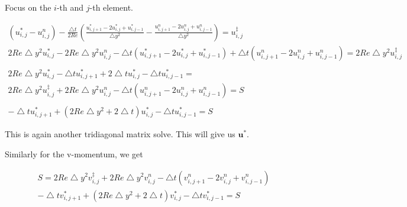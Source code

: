 \documentclass[12pt]{article}
\begin{document}
Focus on the $i$-th and $j$-th element.

\begin{align*}
    (u^*_{i,j} - u^n_{i,j}) - \frac{\bigtriangleup t}{2 Re}(\frac{u^*_{i,j+1} - 2u^*_{i,j} + u^*_{i,j-1}}{\bigtriangleup y^2} - \frac{u^n_{i,j+1} - 2u^n_{i,j} + u^n_{i,j-1}}{\bigtriangleup y^2}) = u^\ddagger_{i,j} \\
    2 Re \bigtriangleup y^2 u^*_{i,j} - 2 Re \bigtriangleup y^2 u^n_{i,j} - \bigtriangleup t(u^*_{i,j+1} - 2 u^*_{i,j} + u^*_{i,j-1}) + \bigtriangleup t(u^n_{i,j+1} - 2u^n_{i,j} + u^n_{i,j-1}) = 2 Re \bigtriangleup y^2 u^\ddagger_{i,j} \\
    \\
    2 Re \bigtriangleup y^2 u^*_{i,j} - \bigtriangleup t u^*_{i,j+1} + 2\bigtriangleup t u^*_{i,j} - \bigtriangleup t u^*_{i,j-1} = \\
    2Re \bigtriangleup y^2 u^\ddagger_{i,j} + 2Re \bigtriangleup y^2 u^n_{i,j} - \bigtriangleup t(u^n_{i,j+1} - 2u^n_{i,j} + u^n_{i,j-1}) = S \\
    \\
    -\bigtriangleup t u^*_{i,j+1} + (2Re \bigtriangleup y^2 + 2\bigtriangleup t)u^*_{i,j} - \bigtriangleup t u^*_{i,j-1} = S
\end{align*}

This is again another tridiagonal matrix solve. This will give us $\mathbf{u}^*$.

Similarly for the v-momentum, we get

\begin{align}
S = 2Re\bigtriangleup y^2 v^\ddagger_{i,j} + 2Re\bigtriangleup y^2 v^n_{i,j} - \bigtriangleup t(v^n_{i,j+1} - 2v^n_{i,j} + v^n_{i,j-1}) \\
-\bigtriangleup t v^*_{i,j+1} + (2Re\bigtriangleup y^2 + 2\bigtriangleup t)v^*_{i,j} - \bigtriangleup t v^*_{i,j-1} = S
\end{align}
\end{document}
